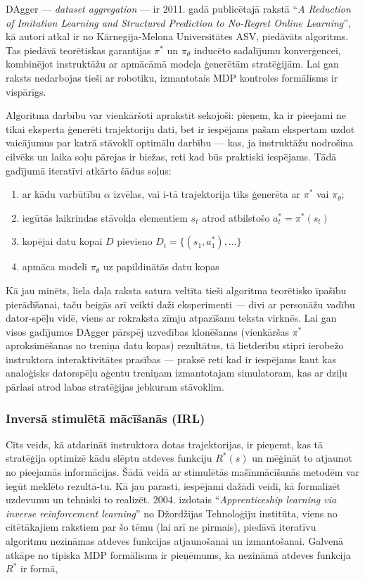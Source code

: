 \documentclass[12pt, a4paper]{article}
\numberwithin{equation}{section} %
\begin{document}
DAgger --- \textit{dataset aggregation} --- ir 2011. gadā publicētajā rakstā ``\textit{A Reduction of Imitation Learning and Structured Prediction
to No-Regret Online Learning}''\cite{ross2011no}, kā autori atkal ir no Kārnegija-Melona Universitātes ASV, piedāvāts algoritms. Tas piedāvā teorētiskas garantijas $\pi^*$ un $\pi_{\theta}$ inducēto sadalījumu konverģencei, kombinējot instruktāžu ar apmācāmā modeļa ģenerētām stratēģijām. Lai gan raksts nedarbojas tieši ar robotiku, izmantotais MDP kontroles formālisms ir vispārīgs.

Algoritma darbību var vienkāršoti aprakstīt sekojoši: pieņem, ka ir pieejami ne tikai eksperta ģenerēti trajektoriju dati, bet ir iespējams pašam ekspertam uzdot vaicājumus par katrā stāvoklī optimālu darbību --- kas, ja instruktāžu nodrošina cilvēks un laika soļu pārejas ir biežas, reti kad būs praktiski iespējams. Tādā gadījumā iteratīvi atkārto šādus soļus:

\begin{enumerate}
    \item ar kādu varbūtību $\alpha$ izvēlas, vai i-tā trajektorija tiks ģenerēta ar $\pi^*$ vai $\pi_{\theta}$;
    \item iegūtās laikrindas stāvokļa elementiem $s_t$ atrod atbilstošo $a^*_t=\pi^*(s_t)$ 
    \item kopējai datu kopai $D$ pievieno $D_i=\lbrace (s_1, a^*_1),... \rbrace$
    \item apmāca modeli $\pi_{\theta}$ uz papildinātās datu kopas
\end{enumerate}

Kā jau minēts, liela daļa raksta satura veltīta tieši algoritma teorētisko īpašību pierādīšanai, taču beigās arī veikti daži eksperimenti --- divi ar personāžu vadību dator-spēļu vidē, viens ar rokraksta zīmju atpazīšanu teksta virknēs. Lai gan visos gadījumos DAgger pārspēj uzvedības klonēšanas (vienkāršas $\pi^*$ aproksimēšanas no treniņa datu kopas) rezultātus, tā lietderību stipri ierobežo instruktora interaktivitātes prasības --- praksē reti kad ir iespējams kaut kas analoģisks datorspēļu aģentu treniņam izmantotajam simulatoram, kas ar dziļu pārlasi atrod labas stratēģijas jebkuram stāvoklim.

\subsubsection{Inversā stimulētā mācīšanās (IRL)}

Cits veids, kā atdarināt instruktora dotas trajektorijas, ir pieņemt, kas tā stratēģija optimizē kādu slēptu atdeves funkciju $R^*(s)$ un mēģināt to atjaunot no pieejamās informācijas. Šādā veidā ar stimulētās mašīnmācīšanās metodēm var iegūt meklēto rezultā-tu. Kā jau parasti, iespējami dažādi veidi, kā formalizēt uzdevumu un tehniski to realizēt. 2004. izdotais ``\textit{Apprenticeship learning via inverse reinforcement learning}''\cite{abbeel2004apprenticeship} no Džordžijas Tehnoloģiju institūta, viens no citētākajiem rakstiem par šo tēmu (lai arī ne pirmais), piedāvā iteratīvu algoritmu nezināmas atdeves funkcijas atjaunošanai un izmantošanai. Galvenā atkāpe no tipiska MDP formālisma ir pieņēmums, ka nezināmā atdeves funkcija $R^*$ ir formā, 
\end{document}
